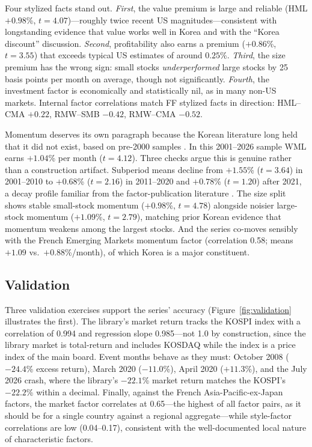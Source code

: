 \documentclass[11pt]{article}
\begin{document}
Four stylized facts stand out. \emph{First}, the value premium is large and reliable (HML $+0.98$\%, $t=4.07$)---roughly twice recent US magnitudes---consistent with longstanding evidence that value works well in Korea and with the ``Korea discount'' discussion. \emph{Second}, profitability also earns a premium ($+0.86$\%, $t=3.55$) that exceeds typical US estimates of around $0.25$\%. \emph{Third}, the size premium has the wrong sign: small stocks \emph{underperformed} large stocks by 25 basis points per month on average, though not significantly. \emph{Fourth}, the investment factor is economically and statistically nil, as in many non-US markets. Internal factor correlations match FF stylized facts in direction: HML--CMA $+0.22$, RMW--SMB $-0.42$, RMW--CMA $-0.52$.

Momentum deserves its own paragraph because the Korean literature long held that it did not exist, based on pre-2000 samples \citep{griffin2003}. In this 2001--2026 sample WML earns $+1.04$\% per month ($t=4.12$). Three checks argue this is genuine rather than a construction artifact. Subperiod means decline from $+1.55$\% ($t=3.64$) in 2001--2010 to $+0.68$\% ($t=2.16$) in 2011--2020 and $+0.78$\% ($t=1.20$) after 2021, a decay profile familiar from the factor-publication literature \citep{mclean2016}. The size split shows stable small-stock momentum ($+0.98$\%, $t=4.78$) alongside noisier large-stock momentum ($+1.09$\%, $t=2.79$), matching prior Korean evidence that momentum weakens among the largest stocks. And the series co-moves sensibly with the French Emerging Markets momentum factor (correlation 0.58; means $+1.09$ vs.\ $+0.88$\%/month), of which Korea is a major constituent.

\subsection{Validation}

Three validation exercises support the series' accuracy (Figure~\ref{fig:validation} illustrates the first). The library's market return tracks the KOSPI index with a correlation of 0.994 and regression slope 0.985---not 1.0 by construction, since the library market is total-return and includes KOSDAQ while the index is a price index of the main board. Event months behave as they must: October 2008 ($-24.4$\% excess return), March 2020 ($-11.0$\%), April 2020 ($+11.3$\%), and the July 2026 crash, where the library's $-22.1$\% market return matches the KOSPI's $-22.2$\% within a decimal. Finally, against the French Asia-Pacific-ex-Japan factors, the market factor correlates at 0.65---the highest of all factor pairs, as it should be for a single country against a regional aggregate---while style-factor correlations are low (0.04--0.17), consistent with the well-documented local nature of characteristic factors.
\end{document}
